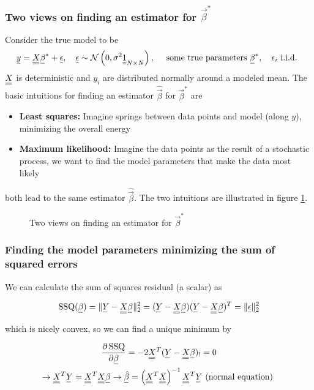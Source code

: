 \subsubsection{Two views on finding an estimator for $\vec{\beta}^*$}
Consider the true model to be
\begin{equation}
    \vec{y}=\mat{X} \vec{\beta}^*+\vec{\epsilon}, \quad \vec{\epsilon} \sim \mathcal{N}\left(0, \sigma^2 \mat{1}_{N \times N}\right), \quad \text { some true parameters } \vec{\beta}^{*}, \quad \epsilon_i \text { i.i.d. }
\end{equation}
$\mat{X}$ is deterministic and $y_i$ are distributed normally around a modeled mean.
The basic intuitions for finding an estimator $\hat{\vec{\beta}}$ for $\vec{\beta}^*$ are
\begin{itemize}
    \item \textbf{Least squares:} Imagine springs between data points and model (along $y$), minimizing the overall energy
    \item \textbf{Maximum likelihood:} Imagine the data points as the result of a stochastic process, we want to find the model parameters that make the data most likely
\end{itemize}
both lead to the same estimator $\hat{\vec{\beta}}$. The two intuitions are illustrated in 
figure \ref{fig:two_views_lin}.

\begin{figure}[!htb]
 \centering
 \hfill
 \caption{Two views on finding an estimator for $\vec{\beta}^*$}
 \label{fig:two_views_lin}
\end{figure}

\subsubsection{Finding the model parameters minimizing the sum of squared errors}
We can calculate the sum of squares residual (a scalar) as

\begin{equation}
    \operatorname{SSQ}(\vec{\beta})=\|\vec{Y}-\mat{X} \vec{\beta}\|_2^2=(\vec{Y}-\mat{X} \vec{\beta})(\vec{Y}-\mat{X} \vec{\beta})^T=\|\vec{\epsilon}\|_2^2
\end{equation}

which is nicely convex, so we can find a unique minimum by

\begin{equation}
    \begin{gathered}
    \frac{\partial \operatorname{SSQ}}{\partial \vec{\beta}}=-2 \mat{X}^T(\vec{Y}-\mat{X} \vec{\beta})_{!}=0 \\
    \rightarrow \mat{X}^T \vec{Y}=\mat{X}^T \mat{X} \vec{\beta} \rightarrow \vec{\hat{\beta}}=\left(\mat{X}^T \mat{X}\right)^{-1} \mat{X}^T \vec{Y} \text { (normal equation) }
    \end{gathered}
\end{equation}

